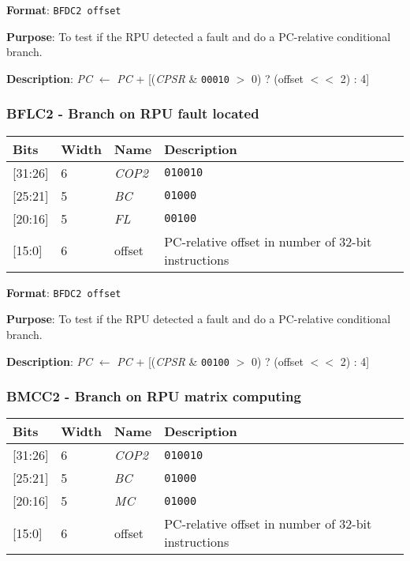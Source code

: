 \documentclass[11pt]{article}
\begin{document}
\textbf{Format}: \texttt{BFDC2 offset}

\textbf{Purpose}: To test if the RPU detected a fault and do a PC-relative conditional branch.

\textbf{Description}: \emph{PC} $\leftarrow$ \emph{PC} + [(\emph{CPSR} \& \texttt{00010} $>$ 0) ? (offset $<<$ 2) : 4]

\text{}
\subsubsection{BFLC2 - Branch on RPU fault located}
\text{}

\begin{table}[H] \centering
  \def\arraystretch{1.4}
  \begin{tabular}{|m{2cm}|m{1.5cm}|m{2.5cm}|m{4.5cm}|}
    \hline
    \textbf{Bits} & \textbf{Width} & \textbf{Name} & \textbf{Description}\\ \hline

    [31:26] & 6 & \emph{COP2} & \texttt{010010}\\ \hline

    [25:21] & 5 & \emph{BC} & \texttt{01000}\\ \hline

    [20:16] & 5 & \emph{FL} & \texttt{00100}\\ \hline

    [15:0] & 6 & offset & PC-relative offset in number of 32-bit instructions\\ \hline
  \end{tabular}
\end{table}

\textbf{Format}: \texttt{BFDC2 offset}

\textbf{Purpose}: To test if the RPU detected a fault and do a PC-relative conditional branch.

\textbf{Description}: \emph{PC} $\leftarrow$ \emph{PC} + [(\emph{CPSR} \& \texttt{00100} $>$ 0) ? (offset $<<$ 2) : 4]


\text{}
\subsubsection{BMCC2 - Branch on RPU matrix computing}
\text{}

\begin{table}[H] \centering
  \def\arraystretch{1.4}
  \begin{tabular}{|m{2cm}|m{1.5cm}|m{2.5cm}|m{4.5cm}|}
    \hline
    \textbf{Bits} & \textbf{Width} & \textbf{Name} & \textbf{Description}\\ \hline

    [31:26] & 6 & \emph{COP2} & \texttt{010010}\\ \hline

    [25:21] & 5 & \emph{BC} & \texttt{01000}\\ \hline

    [20:16] & 5 & \emph{MC} & \texttt{01000}\\ \hline

    [15:0] & 6 & offset & PC-relative offset in number of 32-bit instructions\\ \hline
  \end{tabular}
\end{table}
\end{document}
